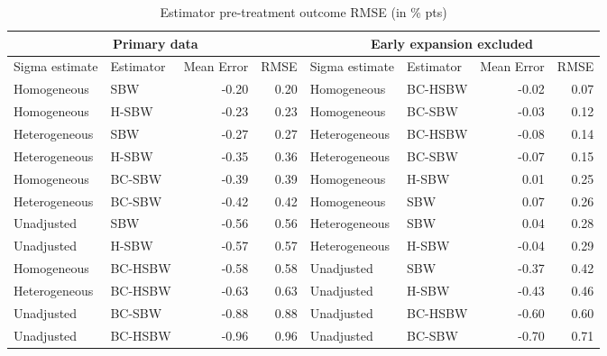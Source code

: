 \documentclass[aoas]{imsart}
\theoremstyle{plain}
\theoremstyle{remark}
\begin{document}
\begin{longtable}{llrrllrr}\caption{Estimator pre-treatment outcome RMSE (in \% pts)}\label{tab:pretxpred}
\hline
\multicolumn{4}{c}{Primary data} & \multicolumn{4}{c}{Early expansion 
 excluded} \\ 
 \hline
Sigma estimate & Estimator & Mean Error & RMSE & Sigma estimate & Estimator & Mean Error & RMSE \\ 
\hline
Homogeneous & SBW & -0.20 & 0.20 & Homogeneous & BC-HSBW & -0.02 & 0.07 \\ 
Homogeneous & H-SBW & -0.23 & 0.23 & Homogeneous & BC-SBW & -0.03 & 0.12 \\ 
Heterogeneous & SBW & -0.27 & 0.27 & Heterogeneous & BC-HSBW & -0.08 & 0.14 \\ 
Heterogeneous & H-SBW & -0.35 & 0.36 & Heterogeneous & BC-SBW & -0.07 & 0.15 \\ 
Homogeneous & BC-SBW & -0.39 & 0.39 & Homogeneous & H-SBW & 0.01 & 0.25 \\ 
Heterogeneous & BC-SBW & -0.42 & 0.42 & Homogeneous & SBW & 0.07 & 0.26 \\ 
Unadjusted & SBW & -0.56 & 0.56 & Heterogeneous & SBW & 0.04 & 0.28 \\ 
Unadjusted & H-SBW & -0.57 & 0.57 & Heterogeneous & H-SBW & -0.04 & 0.29 \\ 
Homogeneous & BC-HSBW & -0.58 & 0.58 & Unadjusted & SBW & -0.37 & 0.42 \\ 
Heterogeneous & BC-HSBW & -0.63 & 0.63 & Unadjusted & H-SBW & -0.43 & 0.46 \\ 
Unadjusted & BC-SBW & -0.88 & 0.88 & Unadjusted & BC-HSBW & -0.60 & 0.60 \\ 
Unadjusted & BC-HSBW & -0.96 & 0.96 & Unadjusted & BC-SBW & -0.70 & 0.71 \\ 
 \hline
\end{longtable}
\end{document}
